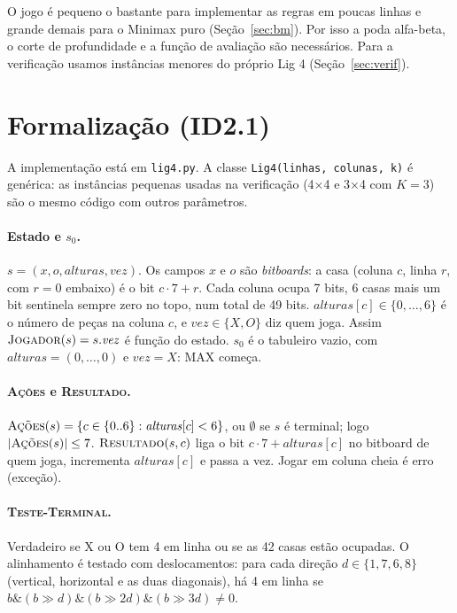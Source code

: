 \documentclass[11pt,a4paper]{article}
\newcommand{\fn}[1]{\textsc{#1}}            %
\newcommand{\arq}[1]{\texttt{#1}}
\begin{document}
O jogo é pequeno o bastante para implementar as regras em poucas linhas e grande demais para o Minimax
puro (Seção~\ref{sec:bm}). Por isso a poda alfa-beta, o corte de profundidade e a função de avaliação são
necessários. Para a verificação usamos instâncias menores do próprio Lig 4 (Seção~\ref{sec:verif}).

\section{Formalização (ID2.1)}
\label{sec:formal}

A implementação está em \arq{lig4.py}. A classe \texttt{Lig4(linhas, colunas, k)} é genérica: as instâncias
pequenas usadas na verificação (4×4 e 3×4 com $K=3$) são o mesmo código com outros parâmetros.

\paragraph{Estado e $s_0$.} $s = (x, o, \mathit{alturas}, \mathit{vez})$. Os campos $x$ e $o$ são
\emph{bitboards}: a casa (coluna $c$, linha $r$, com $r=0$ embaixo) é o bit $c\cdot 7 + r$. Cada coluna ocupa
7 bits, 6 casas mais um bit sentinela sempre zero no topo, num total de 49 bits. $\mathit{alturas}[c] \in \{0,\dots,6\}$ é o número de
peças na coluna $c$, e $\mathit{vez} \in \{X, O\}$ diz quem joga. Assim $\fn{Jogador}(s) = s.\mathit{vez}$ é função
do estado. $s_0$ é o tabuleiro vazio, com $\mathit{alturas} = (0,\dots,0)$ e $\mathit{vez} = X$: MAX começa.

\paragraph{\fn{Ações} e \fn{Resultado}.} $\fn{Ações}(s) = \{c \in \{0..6\} : \mathit{alturas}[c] < 6\}$,
ou $\emptyset$ se $s$ é terminal; logo $|\fn{Ações}(s)| \le 7$. $\fn{Resultado}(s, c)$ liga o bit
$c\cdot 7 + \mathit{alturas}[c]$ no bitboard de quem joga, incrementa $\mathit{alturas}[c]$ e passa a vez.
Jogar em coluna cheia é erro (exceção).

\paragraph{\fn{Teste-Terminal}.} Verdadeiro se X ou O tem 4 em linha ou se as 42 casas estão ocupadas.
O alinhamento é testado com deslocamentos: para cada direção $d \in \{1, 7, 6, 8\}$ (vertical, horizontal e
as duas diagonais), há 4 em linha se $b \mathbin{\&} (b \gg d) \mathbin{\&} (b \gg 2d) \mathbin{\&} (b \gg 3d) \neq 0$.
\end{document}

